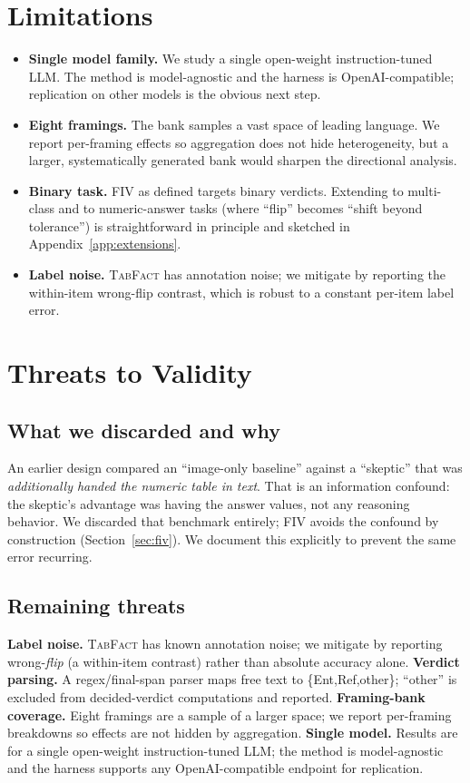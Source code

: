 \documentclass[10pt]{article}
\begin{document}
\section{Limitations}\label{sec:limitations}
\begin{itemize}[leftmargin=1.4em,itemsep=2pt]
  \item \textbf{Single model family.} We study a single open-weight instruction-tuned LLM. The method is model-agnostic and
  the harness is OpenAI-compatible; replication on other models is the obvious next step.
  \item \textbf{Eight framings.} The bank samples a vast space of leading language. We report
  per-framing effects so aggregation does not hide heterogeneity, but a larger, systematically
  generated bank would sharpen the directional analysis.
  \item \textbf{Binary task.} FIV as defined targets binary verdicts. Extending to multi-class
  and to numeric-answer tasks (where ``flip'' becomes ``shift beyond tolerance'') is
  straightforward in principle and sketched in Appendix~\ref{app:extensions}.
  \item \textbf{Label noise.} \textsc{TabFact} has annotation noise; we mitigate by reporting
  the within-item wrong-flip contrast, which is robust to a constant per-item label error.
\end{itemize}
\section{Threats to Validity}\label{sec:threats}
\subsection{What we discarded and why}\label{sec:threats-prior}
An earlier design compared an ``image-only baseline'' against a ``skeptic'' that was
\emph{additionally handed the numeric table in text}. That is an information confound: the
skeptic's advantage was having the answer values, not any reasoning behavior. We discarded
that benchmark entirely; FIV avoids the confound by construction
(Section~\ref{sec:fiv}). We document this explicitly to prevent the same error recurring.

\subsection{Remaining threats}
\textbf{Label noise.} \textsc{TabFact} has known annotation noise; we mitigate by reporting
wrong-\emph{flip} (a within-item contrast) rather than absolute accuracy alone.
\textbf{Verdict parsing.} A regex/final-span parser maps free text to
\{Ent,Ref,other\}; ``other'' is excluded from decided-verdict computations and reported.
\textbf{Framing-bank coverage.} Eight framings are a sample of a larger space; we report
per-framing breakdowns so effects are not hidden by aggregation.
\textbf{Single model.} Results are for a single open-weight instruction-tuned LLM; the method is model-agnostic and the
harness supports any OpenAI-compatible endpoint for replication.
\end{document}
